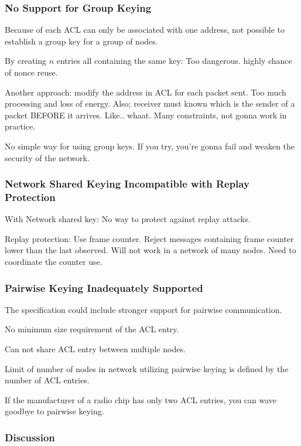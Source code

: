 \documentclass[10pt]{article}
\begin{document}
\subsubsection{No Support for Group Keying}

Because of each ACL can only be associated with one address, not possible to establish a group key for a group of nodes.

By creating $n$ entries all containing the same key: Too dangerous. highly chance of nonce reuse.

Another approach: modify the address in ACL for each packet sent. Too much processing and loss of energy. Also; receiver must known which is the sender of a packet BEFORE it arrives. Like.. whaat. Many constraints, not gonna work in practice.

No simple way for using group keys. If you try, you're gonna fail and weaken the security of the network.

\subsubsection{Network Shared Keying Incompatible with Replay Protection}

With Network shared key: No way to protect against replay attacks.

Replay protection: Use frame counter. Reject messages containing frame counter lower than the last observed. Will not work in a network of many nodes. Need to coordinate the counter use.


\subsubsection{Pairwise Keying Inadequately Supported}

The specification could include stronger support for pairwise communication.

No minimum size requirement of the ACL entry. 

Can not share ACL entry between multiple nodes.

Limit of number of nodes in network utilizing pairwise keying is defined by the number of ACL entries.

If the manufacturer of a radio chip has only two ACL entries, you can wave goodbye to pairwise keying.


\subsubsection{Discussion}
\end{document}
